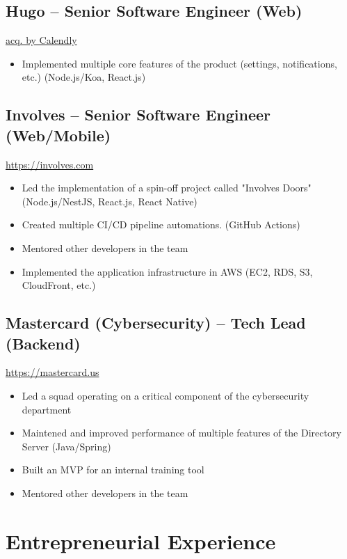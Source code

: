 \documentclass[11pt, a4paper]{article}
\begin{document}
\subsection*{Hugo -- Senior Software Engineer (Web)}
\href{https://www.linkedin.com/company/hugo-team/}{acq. by Calendly}
\begin{itemize}[noitemsep]
    \item Implemented multiple core features of the product (settings, notifications, etc.) (Node.js/Koa, React.js)
\end{itemize}

\subsection*{Involves -- Senior Software Engineer (Web/Mobile)}
\href{https://involves.com/}{https://involves.com}
\begin{itemize}[noitemsep]
    \item Led the implementation of a spin-off project called "Involves Doors" (Node.js/NestJS, React.js, React Native)
    \item Created multiple CI/CD pipeline automations. (GitHub Actions)
    \item Mentored other developers in the team
    \item Implemented the application infrastructure in AWS (EC2, RDS, S3, CloudFront, etc.)
\end{itemize}

\subsection*{Mastercard (Cybersecurity) -- Tech Lead (Backend)}
\href{https://www.mastercard.us/en-us.html}{https://mastercard.us}
\begin{itemize}[noitemsep]
    \item Led a squad operating on a critical component of the cybersecurity department
    \item Maintened and improved performance of multiple features of the Directory Server (Java/Spring)
    \item Built an MVP for an internal training tool
    \item Mentored other developers in the team
\end{itemize}

\section*{Entrepreneurial Experience}
\end{document}
